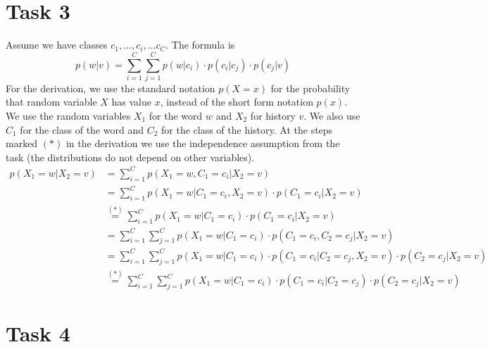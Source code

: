 \documentclass[%
   11pt,              %
   ngerman,           %
   a4paper,           %
   DIV11,             %
]{scrartcl}%
\begin{document}
\section*{Task 3}
Assume we have classes $c_1,\ldots,c_i,\ldots c_C$.
The formula is 
\begin{equation*}
	p(w|v) = \sum_{i=1}^C \sum_{j=1}^C p(w|c_i) \cdot p(c_i|c_j) \cdot p(c_j|v)
\end{equation*}
For the derivation, we use the standard notation $p(X=x)$ for the probability that random variable $X$ has value $x$, instead of the short form notation $p(x)$. We use the random variables $X_1$ for the word $w$ and $X_2$ for history $v$. We also use $C_1$ for the class of the word and $C_2$ for the class of the history. At the steps marked $(*)$ in the derivation we use the independence assumption from the task (the distributions do not depend on other variables).
\begin{align*}
	p(X_1 = w | X_2 = v) &= \sum_{i=1}^C p(X_1 = w, C_1 = c_i | X_2 = v) \\
	&= \sum_{i=1}^C p(X_1 = w|C_1 = c_i, X_2 = v) \cdot p(C_1 = c_i| X_2 = v) \\
	&\overset{(*)}{=} \sum_{i=1}^C p(X_1 = w|C_1 = c_i) \cdot p(C_1 = c_i| X_2 = v) \\
	&= \sum_{i=1}^C \sum_{j=1}^C p(X_1 = w|C_1 = c_i) \cdot p(C_1 = c_i, C_2 = c_j| X_2 = v) \\
	&= \sum_{i=1}^C \sum_{j=1}^C p(X_1 = w|C_1 = c_i) \cdot p(C_1 = c_i| C_2 = c_j, X_2 = v) \cdot p(C_2 = c_j | X_2 = v) \\
	&\overset{(*)}{=} \sum_{i=1}^C \sum_{j=1}^C p(X_1 = w|C_1 = c_i) \cdot p(C_1 = c_i| C_2 = c_j) \cdot p(C_2 = c_j | X_2 = v)
\end{align*}
\section*{Task 4}
\end{document}
